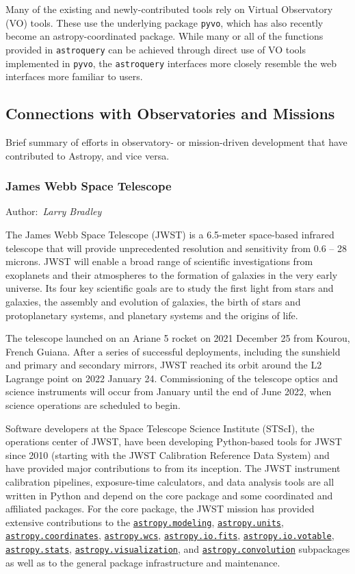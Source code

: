 \documentclass[modern]{aastex631}
\newcommand{\astropysubpkg}[1]{\href{http://docs.astropy.org/en/stable/#1/index.html}{\texttt{astropy.#1}}\xspace}
\newcommand{\secauthor}[1]{{\color{blue}Author:~\textit{#1}}}
\begin{document}
Many of the existing and newly-contributed tools rely on Virtual Observatory (VO) tools.
These use the underlying package \texttt{pyvo}, which has also recently become an astropy-coordinated package. While many or all of the functions provided in \texttt{astroquery} can be achieved through direct use of VO tools implemented in \texttt{pyvo}, the \texttt{astroquery} interfaces more closely resemble the web interfaces more familiar to users.

\subsection{Connections with Observatories and Missions}

Brief summary of efforts in observatory- or mission-driven development that have
contributed to Astropy, and vice versa.

\subsubsection{James Webb Space Telescope}
\secauthor{Larry Bradley}

The James Webb Space Telescope (JWST) is a 6.5-meter space-based
infrared telescope that will provide unprecedented resolution and
sensitivity from 0.6 -- 28 microns. JWST will enable a broad range
of scientific investigations from exoplanets and their atmospheres
to the formation of galaxies in the very early universe. Its four
key scientific goals are to study the first light from stars and
galaxies, the assembly and evolution of galaxies, the birth of stars and
protoplanetary systems, and planetary systems and the origins of life.

The telescope launched on an Ariane 5 rocket on 2021 December 25 from
Kourou, French Guiana. After a series of successful deployments,
including the sunshield and primary and secondary mirrors, JWST reached
its orbit around the L2 Lagrange point on 2022 January 24. Commissioning
of the telescope optics and science instruments will occur from January
until the end of June 2022, when science operations are scheduled to
begin.

Software developers at the Space Telescope Science Institute (STScI),
the operations center of JWST, have been developing Python-based tools
for JWST since 2010 (starting with the JWST Calibration Reference Data
System) and have provided major contributions to \astropy from its
inception. The JWST instrument calibration pipelines, exposure-time
calculators, and data analysis tools are all written in Python and
depend on the \astropypkg core package and some coordinated and
affiliated packages. For the \astropypkg core package, the JWST mission
has provided extensive contributions to the \astropysubpkg{modeling},
\astropysubpkg{units}, \astropysubpkg{coordinates}, \astropysubpkg{wcs},
\astropysubpkg{io.fits}, \astropysubpkg{io.votable},
\astropysubpkg{stats}, \astropysubpkg{visualization}, and
\astropysubpkg{convolution} subpackages as well as to the general
package infrastructure and maintenance.
\end{document}
